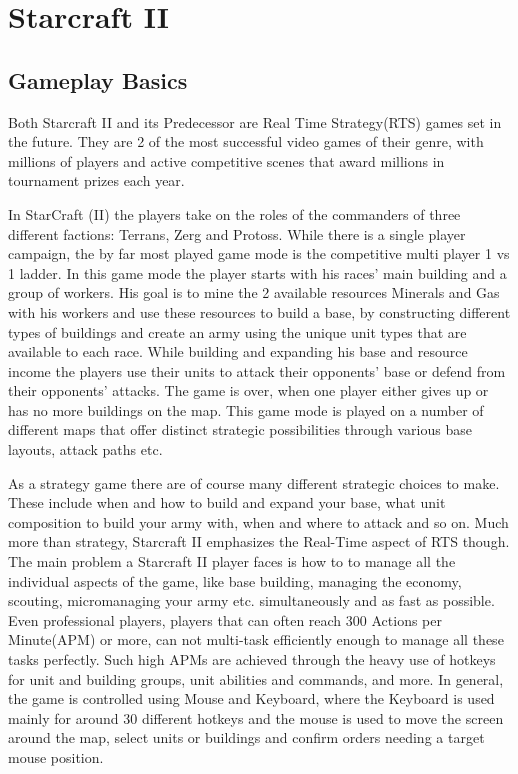 
\chapter{Starcraft II} %

\label{chap_sc2} %

\section{Gameplay Basics}
Both Starcraft II and its Predecessor are Real Time Strategy(RTS) games set in the future. They are 2 of the most successful video games of their genre, with millions of players and active competitive scenes that award millions in tournament prizes each year. 

In StarCraft (II) the players take on the roles of the commanders of three different factions: Terrans, Zerg and Protoss.
While there is a single player campaign, the by far most played game mode is the competitive multi player 1 vs 1 ladder.
In this game mode the player starts with his races' main building and a group of workers.
His goal is to mine the 2 available resources Minerals and Gas with his workers and use these resources to build a base, by constructing different types of buildings and create an army using the unique unit types that are available to each race. While building and expanding his base and resource income the players use their units to attack their opponents' base or defend from their opponents' attacks. The game is over, when one player either gives up or has no more buildings on the map. This game mode is played on a number of different maps that offer distinct strategic possibilities through various base layouts, attack paths etc.

As a strategy game there are of course many different strategic choices to make.
These include when and how to build and expand your base, what unit composition to build your army with, when and where to attack and so on.
Much more than strategy, Starcraft II emphasizes the Real-Time aspect of RTS though. The main problem a Starcraft II player faces is how to to manage all the individual aspects of the game, like base building, managing the economy, scouting, micromanaging your army etc. simultaneously and as fast as possible. Even professional players, players that can often reach 300 Actions per Minute(APM) or more, can not multi-task efficiently enough to manage all these tasks perfectly. Such high APMs are achieved through the heavy use of hotkeys for unit and building groups, unit abilities and commands, and more.
In general, the game is controlled using Mouse and Keyboard, where the Keyboard is used mainly for around 30 different hotkeys and the mouse is used to move the screen around the map, select units or buildings and confirm orders needing a target mouse position.

